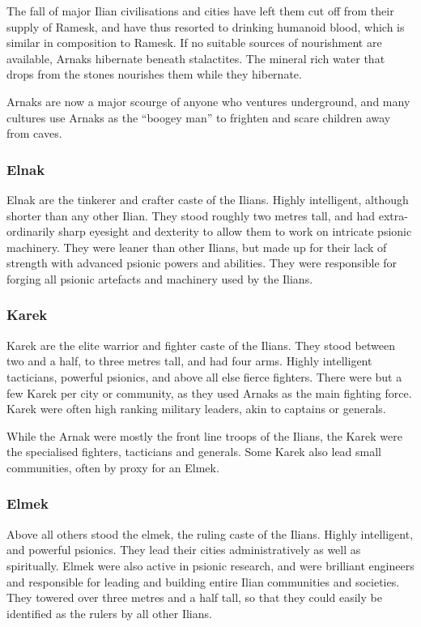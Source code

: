 The fall of major Ilian civilisations and cities have left them cut off from
their supply of Ramesk, and have thus resorted to drinking humanoid blood,
which is similar in composition to Ramesk. If no suitable sources of nourishment
are available, Arnaks hibernate beneath stalactites. The mineral rich water
that drops from the stones nourishes them while they hibernate.

Arnaks are now a major scourge of anyone who ventures underground, and many
cultures use Arnaks as the ``boogey man'' to frighten and scare children away
from caves.

\subsubsection{Elnak}
\label{sec:Elnak}

Elnak are the tinkerer and crafter caste of the Ilians. Highly intelligent,
although shorter than any other Ilian. They stood roughly two metres tall, and
had extra-ordinarily sharp eyesight and dexterity to allow them to work on
intricate psionic machinery. They were leaner than other Ilians, but made up
for their lack of strength with advanced psionic powers and abilities. They
were responsible for forging all psionic artefacts and machinery used by the
Ilians.

\subsubsection{Karek}
\label{sec:Karek}

Karek are the elite warrior and fighter caste of the Ilians. They stood between
two and a half, to three metres tall, and had four arms. Highly intelligent
tacticians, powerful psionics, and above all else fierce fighters. There were
but a few Karek per city or community, as they used Arnaks as the main fighting
force. Karek were often high ranking military leaders, akin to captains or
generals.

While the Arnak were mostly the front line troops of the Ilians, the Karek were
the specialised fighters, tacticians and generals. Some Karek also lead small
communities, often by proxy for an Elmek.

\subsubsection{Elmek}
\label{sec:Elmek}

Above all others stood the elmek, the ruling caste of the Ilians. Highly
intelligent, and powerful psionics. They lead their cities administratively as
well as spiritually. Elmek were also active in psionic research, and were
brilliant engineers and responsible for leading and building entire Ilian
communities and societies. They towered over three metres and a half tall,
so that they could easily be identified as the rulers by all other Ilians.

